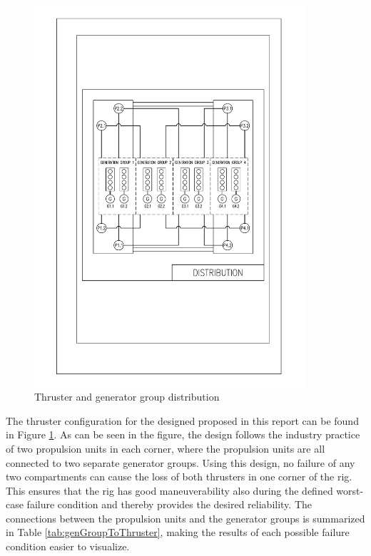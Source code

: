  \begin{figure}[h!]
 	\centering
	\includegraphics[width = 10cm]{figures/Single_Line_distribution.pdf}
	\caption{Thruster and generator group distribution}
	\label{fig:ThrusterAndGeneratorGroupDistribution}
\end{figure}	

The thruster configuration for the designed proposed in this report can be found in Figure \ref{fig:ThrusterAndGeneratorGroupDistribution}. As can be seen in the figure, the design follows the industry practice of two propulsion units in each corner, where the propulsion units are all connected to two separate generator groups. Using this design, no failure of any two compartments can cause the loss of both thrusters in one corner of the rig. This ensures that the rig has good maneuverability also during the defined worst-case failure condition and thereby provides the desired reliability. The connections between the propulsion units and the generator groups is summarized in Table \ref{tab:genGroupToThruster}, making the results of each possible failure condition easier to visualize.   

